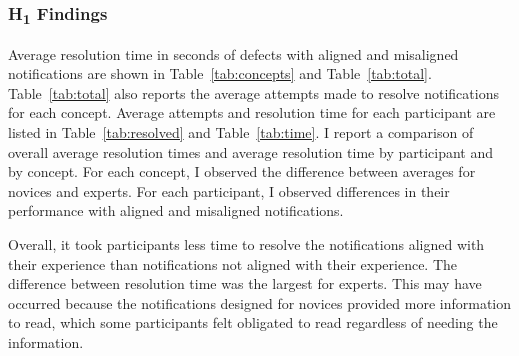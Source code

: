 

\subsubsection*{H\textsubscript{1} Findings}
Average resolution time in seconds of defects with aligned and misaligned notifications are shown in Table~\ref{tab:concepts} and Table~\ref{tab:total}. Table~\ref{tab:total} also reports the average attempts made to resolve notifications for each concept. 
Average attempts and resolution time for each participant are listed in Table~\ref{tab:resolved} and Table~\ref{tab:time}. 
I report a comparison of overall average resolution times and average resolution time by participant and by concept. For each concept, I observed the difference between averages for novices and experts. For each participant, I observed differences in their performance with aligned and misaligned notifications.

Overall, it took participants less time to resolve the notifications aligned with their experience than notifications not aligned with their experience. 
The difference between resolution time was the largest for experts. 
This may have occurred because the notifications designed for novices provided more information to read, which some participants felt obligated to read regardless of needing the information.


